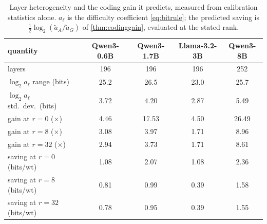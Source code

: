 \begin{table}[H]
\centering
\small
\setlength{\tabcolsep}{3pt}
\caption{Layer heterogeneity and the coding gain it predicts, measured from calibration statistics alone. $a_\ell$ is the difficulty coefficient \eqref{eq:bitrule}; the predicted saving is $\frac{1}{2}\log_2(\tilde a_A/\tilde a_G)$ of \cref{thm:codinggain}, evaluated at the stated rank.}
\label{tab:spread}
\begin{tabular}{lcccc}
\toprule
quantity & Qwen3-0.6B & Qwen3-1.7B & Llama-3.2-3B & Qwen3-8B \\
\midrule
layers & 196 & 196 & 196 & 252 \\
$\log_2 a_\ell$ range (bits) & 25.2 & 26.5 & 23.0 & 25.7 \\
$\log_2 a_\ell$ std.\ dev.\ (bits) & 3.72 & 4.20 & 2.87 & 5.49 \\
\midrule
gain at $r=0$ ($\times$) & 4.46 & 17.53 & 4.50 & 26.49 \\
gain at $r=8$ ($\times$) & 3.08 & 3.97 & 1.71 & 8.96 \\
gain at $r=32$ ($\times$) & 2.94 & 3.73 & 1.71 & 8.61 \\
saving at $r=0$ (bits/wt) & 1.08 & 2.07 & 1.08 & 2.36 \\
saving at $r=8$ (bits/wt) & 0.81 & 0.99 & 0.39 & 1.58 \\
saving at $r=32$ (bits/wt) & 0.78 & 0.95 & 0.39 & 1.55 \\
\bottomrule
\end{tabular}
\end{table}
